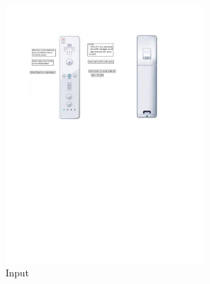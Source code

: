 \begin{figure}[htbp]
	\centering
	\includegraphics[width=3in]{figs/appendix-wiimote.pdf}
	\caption{Input}
	\label{fig:appendix}
\end{figure}
